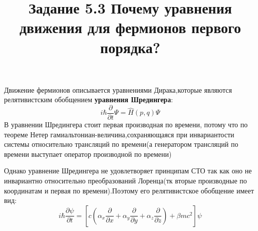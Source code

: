 \documentclass[12pt]{article}
\title{Задание 5.3 Почему уравнения движения для фермионов первого порядка?}
\begin{document}
 \maketitle
 Движение фермионов описывается уравнениями Дирака,которые являются релятивистским обобщением \textbf{уравнения Шредингера}:
 \begin{equation}
 i \hbar \frac{\partial}{\partial t} \Psi=\hat{H}(p, q) \Psi
 \end{equation}
 В уравнении Шредингера стоит первая производная по времени, потому что по теореме Нетер гамиальтониан-величина,сохраняющаяся при инвариантости системы относительно трансляций по времени(а генератором трансляций по времени выступает оператор производной по времени)
 
 Однако уравнение Шредингера не удовлетворяет принципам СТО так как оно не инвариантно относительно преобразований Лоренца(тк вторые производные по координатам и первая по времени).Поэтому его релятивистское обобщение имеет вид:
 \begin{equation}
 i \hbar \frac{\partial \psi}{\partial t}=\left[c\left(\alpha_{x} \frac{\partial}{\partial x}+\alpha_{y} \frac{\partial}{\partial y}+\alpha_{z} \frac{\partial}{\partial z}\right)+\beta m c^{2}\right] \psi
 \end{equation}
 
\end{document}
